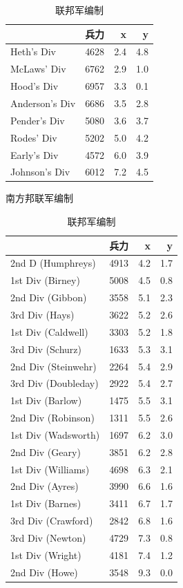 \documentclass{sicnuthesis}
\begin{document}
\begin{table}[h]
\parbox{.45\linewidth}{
\begin{tabular}{lrrr}
\toprule
{} &  兵力 &    x &    y \\
\midrule
Heth's Div     &      4628 &  2.4 &  4.8 \\
McLaws' Div    &      6762 &  2.9 &  1.0 \\
Hood's Div     &      6957 &  3.3 &  0.1 \\
Anderson's Div &      6686 &  3.5 &  2.8 \\
Pender's Div   &      5080 &  3.6 &  3.7 \\
Rodes' Div     &      5202 &  5.0 &  4.2 \\
Early's Div    &      4572 &  6.0 &  3.9 \\
Johnson's Div  &      6012 &  7.2 &  4.5 \\
\bottomrule
\end{tabular}
\caption{南方邦联军编制}
\label{tab:Confederate}
}
\hfill
\parbox{.45\linewidth}{
\begin{tabular}{lrrr}
\toprule
{} &  兵力 &    x &    y \\
\midrule
2nd D (Humphreys)   &      4913 &  4.2 &  1.7 \\
1st Div (Birney)    &      5008 &  4.5 &  0.8 \\
2nd Div (Gibbon)    &      3558 &  5.1 &  2.3 \\
3rd Div (Hays)      &      3622 &  5.2 &  2.6 \\
1st Div (Caldwell)  &      3303 &  5.2 &  1.8 \\
3rd Div (Schurz)    &      1633 &  5.3 &  3.1 \\
2nd Div (Steinwehr) &      2264 &  5.4 &  2.9 \\
3rd Div (Doubleday) &      2922 &  5.4 &  2.7 \\
1st Div (Barlow)    &      1475 &  5.5 &  3.1 \\
2nd Div (Robinson)  &      1311 &  5.5 &  2.6 \\
1st Div (Wadsworth) &      1697 &  6.2 &  3.0 \\
2nd Div (Geary)     &      3851 &  6.2 &  2.8 \\
1st Div (Williams)  &      4698 &  6.3 &  2.1 \\
2nd Div (Ayres)     &      3990 &  6.6 &  1.6 \\
1st Div (Barnes)    &      3411 &  6.7 &  1.7 \\
3rd Div (Crawford)  &      2842 &  6.8 &  1.6 \\
3rd Div (Newton)    &      4729 &  7.3 &  0.8 \\
1st Div (Wright)    &      4181 &  7.4 &  1.2 \\
2nd Div (Howe)      &      3548 &  9.3 &  0.0 \\
\bottomrule
\end{tabular}
\caption{联邦军编制}
\label{tab:Union}
}
\end{table}
\end{document}
